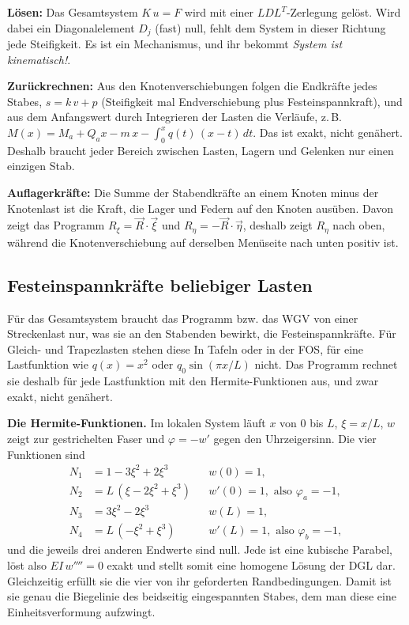 \textbf{Lösen:} Das Gesamtsystem $K\,u = F$ wird mit einer $LDL^T$-Zerlegung gelöst. Wird dabei
ein Diagonalelement $D_j$ (fast) null, fehlt dem System in dieser Richtung jede Steifigkeit. Es
ist ein Mechanismus, und ihr bekommt \emph{System ist kinematisch!}.

\textbf{Zurückrechnen:} Aus den Knotenverschiebungen folgen die Endkräfte jedes Stabes,
$s = k\,v + p$ (Steifigkeit mal Endverschiebung plus Festeinspannkraft), und aus dem Anfangswert
durch Integrieren der Lasten die Verläufe, z.\,B.\
$M(x) = M_a + Q_a x - m\,x - \int_0^x q(t)\,(x-t)\,dt$. Das ist exakt, nicht genähert. Deshalb
braucht jeder Bereich zwischen Lasten, Lagern und Gelenken nur einen einzigen Stab.

\textbf{Auflagerkräfte:} Die Summe der Stabendkräfte an einem Knoten minus der Knotenlast ist die
Kraft, die Lager und Federn auf den Knoten ausüben. Davon zeigt das Programm
$R_\xi = \vec R\cdot\vec\xi$ und $R_\eta = -\vec R\cdot\vec\eta$, deshalb zeigt $R_\eta$ nach oben,
während die Knotenverschiebung \code{ü\_y} auf derselben Menüseite nach unten positiv ist.

\subsection{Festeinspannkräfte beliebiger Lasten}\label{sec:mathe-festeinspann}

Für das Gesamtsystem braucht das Programm bzw. das WGV von einer Streckenlast nur, was sie an den Stabenden
bewirkt, die Festeinspannkräfte. Für Gleich- und Trapezlasten stehen diese In Tafeln oder in der FOS, für eine
Lastfunktion wie $q(x) = x^2$ oder $q_0 \sin(\pi x/L)$ nicht. Das Programm rechnet sie deshalb für
jede Lastfunktion mit den Hermite-Funktionen aus, und zwar exakt, nicht genähert.

\textbf{Die Hermite-Funktionen.} Im lokalen System läuft $x$ von $0$ bis $L$, $\xi = x/L$, $w$ zeigt
zur gestrichelten Faser und $\varphi = -w'$ gegen den Uhrzeigersinn. Die vier Funktionen sind
\begin{align*}
  N_1 &= 1 - 3\xi^2 + 2\xi^3       && w(0) = 1, \\
  N_2 &= L\,(\xi - 2\xi^2 + \xi^3) && w'(0) = 1, \text{ also } \varphi_a = -1, \\
  N_3 &= 3\xi^2 - 2\xi^3           && w(L) = 1, \\
  N_4 &= L\,(-\xi^2 + \xi^3)       && w'(L) = 1, \text{ also } \varphi_b = -1,
\end{align*}
und die jeweils drei anderen Endwerte sind null. Jede ist eine kubische Parabel, löst also
$EI\,w'''' = 0$ exakt und stellt somit eine homogene Lösung der DGL dar.
Gleichzeitig erfüllt sie die vier von ihr geforderten Randbedingungen. Damit ist sie genau die Biegelinie des
beidseitig eingespannten Stabes, dem man diese eine Einheitsverformung aufzwingt.

